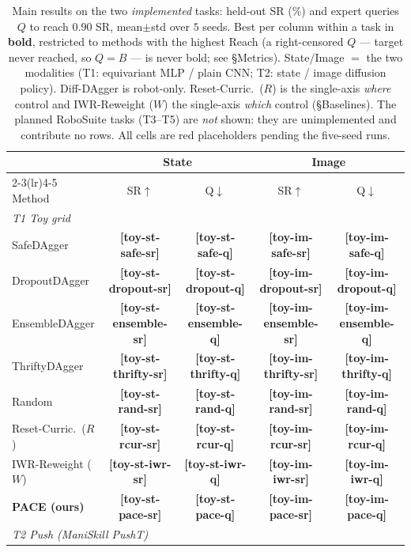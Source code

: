 \documentclass[letterpaper]{article} %
\newcommand{\PH}[1]{{\color{red}\textbf{[#1]}}}
\begin{document}
\begin{table}[t]
\centering
\small
\caption{Main results on the two \emph{implemented} tasks: held-out SR (\%) and
expert queries $Q$ to reach $0.90$ SR, mean$\pm$std over $5$ seeds. Best per
column within a task in \textbf{bold}, restricted to methods with the highest
Reach (a right-censored $Q$ --- target never reached, so $Q{=}B$ --- is never
bold; see \S Metrics). State/Image $=$ the two modalities (T1: equivariant MLP /
plain CNN; T2: state / image diffusion policy). Diff-DAgger is robot-only.
Reset-Curric.\ ($R$) is the single-axis \emph{where} control and IWR-Reweight ($W$)
the single-axis \emph{which} control (\S Baselines). The
planned RoboSuite tasks (T3--T5) are \emph{not} shown: they are unimplemented and
contribute no rows. All cells are red placeholders pending the five-seed runs.}
\label{tab:main}
\begin{tabular}{l cc cc}
\toprule
 & \multicolumn{2}{c}{State} & \multicolumn{2}{c}{Image} \\
\cmidrule(lr){2-3}\cmidrule(lr){4-5}
Method & SR$\uparrow$ & Q$\downarrow$ & SR$\uparrow$ & Q$\downarrow$ \\
\midrule
\multicolumn{5}{l}{\emph{T1 Toy grid}}\\
SafeDAgger     & \PH{toy-st-safe-sr}     & \PH{toy-st-safe-q}     & \PH{toy-im-safe-sr}     & \PH{toy-im-safe-q} \\
DropoutDAgger  & \PH{toy-st-dropout-sr}  & \PH{toy-st-dropout-q}  & \PH{toy-im-dropout-sr}  & \PH{toy-im-dropout-q} \\
EnsembleDAgger & \PH{toy-st-ensemble-sr} & \PH{toy-st-ensemble-q} & \PH{toy-im-ensemble-sr} & \PH{toy-im-ensemble-q} \\
ThriftyDAgger  & \PH{toy-st-thrifty-sr}  & \PH{toy-st-thrifty-q}  & \PH{toy-im-thrifty-sr}  & \PH{toy-im-thrifty-q} \\
Random         & \PH{toy-st-rand-sr}     & \PH{toy-st-rand-q}     & \PH{toy-im-rand-sr}     & \PH{toy-im-rand-q} \\
Reset-Curric.\ ($R$) & \PH{toy-st-rcur-sr} & \PH{toy-st-rcur-q} & \PH{toy-im-rcur-sr} & \PH{toy-im-rcur-q} \\
IWR-Reweight ($W$)   & \PH{toy-st-iwr-sr}  & \PH{toy-st-iwr-q}  & \PH{toy-im-iwr-sr}  & \PH{toy-im-iwr-q} \\
\textbf{PACE (ours)} & \PH{toy-st-pace-sr} & \PH{toy-st-pace-q} & \PH{toy-im-pace-sr} & \PH{toy-im-pace-q} \\
\midrule
\multicolumn{5}{l}{\emph{T2 Push (ManiSkill PushT)}}\\

\end{tabular}
\end{table}
\end{document}
